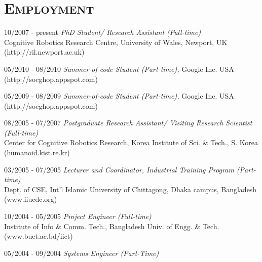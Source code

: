 \documentclass[notopicbreak,contbibnum,plain]{simplecv}
\begin{document}
\section{\textsc{Employment}}
\vspace*{-0.1cm}
\begin{topic}
	\item[10/2007 - present] \textit{PhD Student/ Research Assistant (Full-time)}\\
    Cognitive Robotics Research Centre,
    University of Wales, Newport, UK (\small http://ril.newport.ac.uk)
    \vspace*{-0.1cm}
    \normalsize    
    \item[05/2010 - 08/2010] \textit{Summer-of-code Student (Part-time),}
    Google Inc.  USA (\small http://socghop.appspot.com)
\vspace*{-0.1cm}
 \normalsize 
	    \item[05/2009 - 08/2009] \textit{Summer-of-code Student  (Part-time),}
    Google Inc.  USA (\small http://socghop.appspot.com)
\vspace*{-0.1cm}
 \normalsize      
    \item[08/2005 - 07/2007] \textit{Postgraduate Research Assistant/ Visiting Research Scientist (Full-time)\\}
    Center for Cognitive Robotics Research,
    Korea Institute of Sci. \& Tech., S. Korea (\small humanoid.kist.re.kr)
\vspace*{-0.1cm}
 \normalsize 
\item[03/2005 - 07/2005] \textit{Lecturer and Coordinator, Industrial Training Program (Part-time)}\\
	Dept. of CSE, Int'l Islamic University of Chittagong, Dhaka campus, Bangladesh (\small www.iiucdc.org)
\vspace*{-0.1cm}
 \normalsize     
    \item[10/2004 - 05/2005] \textit{Project Engineer (Full-time) }\\
	Institute of Info \& Comm. Tech.,
	Bangladesh Univ. of Engg. \& Tech. (\small www.buet.ac.bd/iict)
\vspace*{-0.1cm}
 \normalsize 
	\item[05/2004 - 09/2004]\textit{ Systems Engineer (Part-Time)}

\end{topic}
\end{document}
